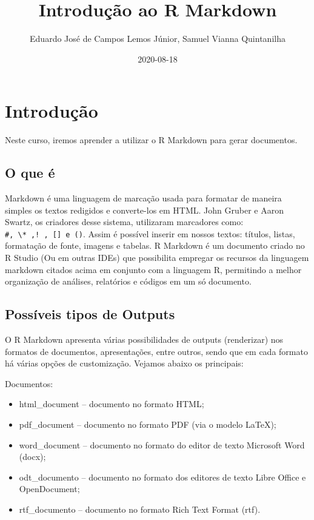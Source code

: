 \documentclass[
]{book}
\title{Introdução ao R Markdown}
\author{Eduardo José de Campos Lemos Júnior, Samuel Vianna Quintanilha}
\date{2020-08-18}
\providecommand{\tightlist}{%
  \setlength{\itemsep}{0pt}\setlength{\parskip}{0pt}}
\begin{document}
\maketitle

{
\setcounter{tocdepth}{1}
\tableofcontents
}
\hypertarget{intro}{%
\chapter{Introdução}\label{intro}}

Neste curso, iremos aprender a utilizar o R Markdown para gerar documentos.

\hypertarget{o-que-uxe9}{%
\section{O que é}\label{o-que-uxe9}}

Markdown é uma linguagem de marcação usada para formatar de maneira simples os textos redigidos e converte-los em HTML. John Gruber e Aaron Swartz, os criadores desse sistema, utilizaram marcadores como: \texttt{\#,\ \textbackslash{}*\ ,!\ ,\ {[}{]}\ e\ ()}. Assim é possível inserir em nossos textos: títulos, listas, formatação de fonte, imagens e tabelas.
R Markdown é um documento criado no R Studio (Ou em outras IDEs) que possibilita empregar os recursos da linguagem markdown citados acima em conjunto com a linguagem R, permitindo a melhor organização de análises, relatórios e códigos em um só documento.

\hypertarget{possuxedveis-tipos-de-outputs}{%
\section{Possíveis tipos de Outputs}\label{possuxedveis-tipos-de-outputs}}

O R Markdown apresenta várias possibilidades de outputs (renderizar) nos formatos de documentos, apresentações, entre outros, sendo que em cada formato há várias opções de customização. Vejamos abaixo os principais:

Documentos:

\begin{itemize}
\tightlist
\item
  html\_document -- documento no formato HTML;
\item
  pdf\_document -- documento no formato PDF (via o modelo LaTeX);
\item
  word\_document -- documento no formato do editor de texto Microsoft Word (docx);
\item
  odt\_documento -- documento no formato dos editores de texto Libre Office e OpenDocument;
\item
  rtf\_documento -- documento no formato Rich Text Format (rtf).
\end{itemize}
\end{document}
